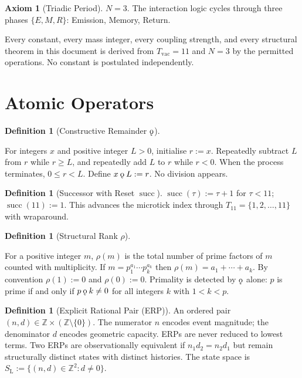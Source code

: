 \documentclass[11pt,letterpaper]{article}
\theoremstyle{plain}
\theoremstyle{definition}
\newtheorem{definition}[theorem]{Definition}
\newtheorem{axiom}{Axiom}
\theoremstyle{remark}
\newcommand{\Z}{\mathbb{Z}}
\newcommand{\SL}{S_{\mathrm{L}}}
\renewcommand{\succ}{\operatorname{succ}}
\newcommand{\rank}{\rho}
\newcommand{\koppa}{\mathbin{\text{\rm\k{o}}}}
\newcommand{\Tcyc}{T_{11}}
\newcommand{\Tvac}{T_{\mathrm{vac}}}
\begin{document}
\begin{axiom}[Triadic Period]\label{ax:N}
$N=3$.  The interaction logic cycles through three phases
$\{E,M,R\}$: Emission, Memory, Return.
\end{axiom}

Every constant, every mass integer, every coupling strength, and every
structural theorem in this document is derived from $\Tvac=11$ and
$N=3$ by the permitted operations.  No constant is postulated
independently.

\section{Atomic Operators}

\begin{definition}[Constructive Remainder $\koppa$]\label{def:koppa}
\begin{rsbox}
For integers $x$ and positive integer $L>0$, initialise $r:=x$.
Repeatedly subtract $L$ from $r$ while $r\geq L$, and repeatedly add
$L$ to $r$ while $r<0$.  When the process terminates, $0\leq r<L$.
Define $x\koppa L:=r$.  No division appears.
\end{rsbox}
\end{definition}

\begin{definition}[Successor with Reset $\succ$]\label{def:succ}
$\succ(\tau):=\tau+1$ for $\tau<11$;\quad $\succ(11):=1$.
This advances the microtick index through
$\Tcyc=\{1,2,\ldots,11\}$ with wraparound.
\end{definition}

\begin{definition}[Structural Rank $\rank$]\label{def:rank}
\begin{rsbox}
For a positive integer $m$, $\rank(m)$ is the total number of prime
factors of $m$ counted with multiplicity.  If $m=p_1^{a_1}\cdots
p_k^{a_k}$ then $\rank(m)=a_1+\cdots+a_k$.  By convention
$\rank(1):=0$ and $\rank(0):=0$.  Primality is detected by $\koppa$
alone: $p$ is prime if and only if $p\koppa k\neq0$ for all integers
$k$ with $1<k<p$.
\end{rsbox}
\end{definition}

\begin{definition}[Explicit Rational Pair (ERP)]\label{def:ERP}
An ordered pair $(n,d)\in\Z\times(\Z\setminus\{0\})$.  The numerator
$n$ encodes event magnitude; the denominator $d$ encodes geometric
capacity.  ERPs are never reduced to lowest terms.  Two ERPs are
observationally equivalent if $n_1 d_2=n_2 d_1$ but remain
structurally distinct states with distinct histories.  The state space
is $\SL:=\{(n,d)\in\Z^2:d\neq0\}$.
\end{definition}
\end{document}
